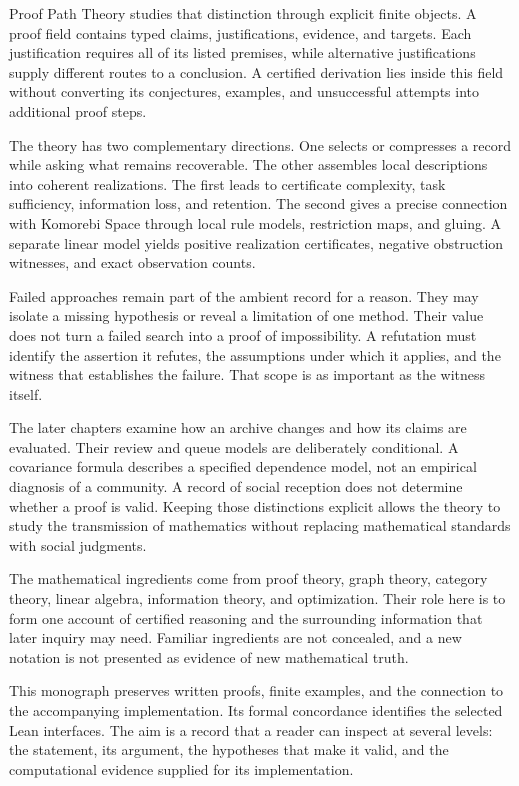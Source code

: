 \documentclass[11pt,oneside]{article}
\theoremstyle{komorebiplain}
\theoremstyle{komorebidefinition}
\theoremstyle{komorebiremark}
\begin{document}
Proof Path Theory studies that distinction through explicit finite objects. A proof field contains typed claims, justifications, evidence, and targets. Each justification requires all of its listed premises, while alternative justifications supply different routes to a conclusion. A certified derivation lies inside this field without converting its conjectures, examples, and unsuccessful attempts into additional proof steps.

The theory has two complementary directions. One selects or compresses a record while asking what remains recoverable. The other assembles local descriptions into coherent realizations. The first leads to certificate complexity, task sufficiency, information loss, and retention. The second gives a precise connection with Komorebi Space through local rule models, restriction maps, and gluing. A separate linear model yields positive realization certificates, negative obstruction witnesses, and exact observation counts.

Failed approaches remain part of the ambient record for a reason. They may isolate a missing hypothesis or reveal a limitation of one method. Their value does not turn a failed search into a proof of impossibility. A refutation must identify the assertion it refutes, the assumptions under which it applies, and the witness that establishes the failure. That scope is as important as the witness itself.

The later chapters examine how an archive changes and how its claims are evaluated. Their review and queue models are deliberately conditional. A covariance formula describes a specified dependence model, not an empirical diagnosis of a community. A record of social reception does not determine whether a proof is valid. Keeping those distinctions explicit allows the theory to study the transmission of mathematics without replacing mathematical standards with social judgments.

The mathematical ingredients come from proof theory, graph theory, category theory, linear algebra, information theory, and optimization. Their role here is to form one account of certified reasoning and the surrounding information that later inquiry may need. Familiar ingredients are not concealed, and a new notation is not presented as evidence of new mathematical truth.

This monograph preserves written proofs, finite examples, and the connection to the accompanying implementation. Its formal concordance identifies the selected Lean interfaces. The aim is a record that a reader can inspect at several levels: the statement, its argument, the hypotheses that make it valid, and the computational evidence supplied for its implementation.
\end{document}
